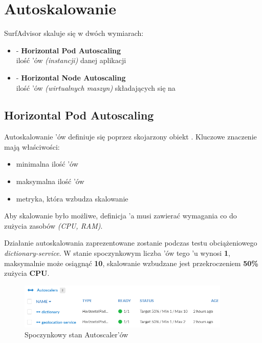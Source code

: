 \chapter{Autoskalowanie}
\label{cha:autoscaling}

 SurfAdvisor skaluje się w dwóch wymiarach:

\begin{itemize}
    \item
     - \textbf{Horizontal Pod Autoscaling}\\
    ilość 'ów \emph{(instancji)} danej aplikacji
    \item
     - \textbf{Horizontal Node Autoscaling}\\
    ilość 'ów \emph{(wirtualnych maszyn)} składających się na 
\end{itemize} 

\section{Horizontal Pod Autoscaling}

Autoskalowanie 'ów definiuje się poprzez skojarzony obiekt .
Kluczowe znaczenie mają właściwości:

\begin{itemize}
    \item
    minimalna ilość 'ów
    \item
    maksymalna ilość 'ów
    \item
    metryka, która wzbudza skalowanie
\end{itemize} 

Aby skalowanie było możliwe, definicja 'a musi zawierać wymagania co do zużycia zasobów \emph{(CPU, RAM)}.

Działanie autoskalowania zaprezentowane zostanie podczas testu obciążeniowego \emph{dictionary-service}.
W stanie spoczynkowym liczba 'ów tego 'u wynosi \textbf{1}, maksymalnie może osiągnąć \textbf{10}, 
skalowanie wzbudzane jest przekroczeniem \textbf{50\%} zużycia \textbf{CPU}.

\begin{figure}[!ht]
	\begin{center}
		\includegraphics[width=0.9\textwidth]{img/autoscaling/hpa-autoscalers-normal}
	\end{center}
    \caption{Spoczynkowy stan Autoscaler'ów}
\end{figure}

